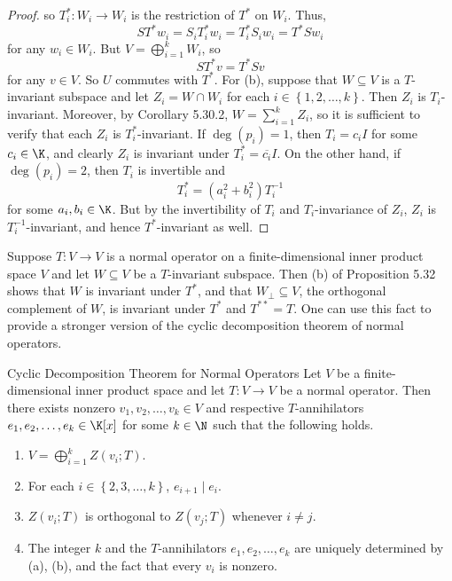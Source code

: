 \documentclass[linearalgebraII]{subfiles}
\begin{document}
\begin{proof}
        so $T_i^{*} : W_i\to W_i$ is the restriction of $T^{*}$ on $W_i$. Thus,
        \begin{equation*}
            ST^{*} w_i = S_iT_i^{*} w_i = T_i^{*}S_iw_i = T^{*} Sw_i
        \end{equation*}
        for any $w_i\in W_i$. But $V=\bigoplus^{k}_{i=1} W_i$, so
        \begin{equation*}
            ST^{*} v = T^{*} Sv
        \end{equation*}
        for any $v\in V$. So $U$ commutes with $T^{*}$. For (b), suppose that $W\subseteq V$ is a $T$-invariant subspace and let $Z_i = W\cap W_i$ for each $i\in\left\lbrace 1,2,\ldots,k \right\rbrace$. Then $Z_i$ is $T_i$-invariant. Moreover, by Corollary 5.30.2, $W = \sum^{k}_{i=1} Z_i$, so it is sufficient to verify that each $Z_i$ is $T_i^{*}$-invariant. If $\deg\left( p_i \right) = 1$, then $T_i = c_iI$ for some $c_i\in\K$, and clearly $Z_i$ is invariant under $T_i^{*} = \overline{c_i}I$. On the other hand, if $\deg\left( p_i \right) = 2$, then $T_i$ is invertible and
        \begin{equation*}
            T_i^{*}  = \left( a_i^{2} +b_i^{2}  \right) T_i^{-1} 
        \end{equation*}
        for some $a_i,b_i\in\K$. But by the invertibility of $T_i$ and $T_i$-invariance of $Z_i$, $Z_i$ is $T_i^{-1}$-invariant, and hence $T^{*}$-invariant as well.
    \end{proof}

    \begin{remark}
        Suppose $T:V\to V$ is a normal operator on a finite-dimensional inner product space $V$ and let $W\subseteq V$ be a $T$-invariant subspace. Then (b) of Proposition 5.32 shows that $W$ is invariant under $T^{*}$, and that $W_\perp\subseteq V$, the orthogonal complement of $W$, is invariant under $T^{*}$ and $T^{**} = T$. One can use this fact to provide a stronger version of the cyclic decomposition theorem of normal operators.
    \end{remark}

    \begin{theorem}{Cyclic Decomposition Theorem for Normal Operators}
        Let $V$ be a finite-dimensional inner product space and let $T:V\to V$ be a normal operator. Then there exists nonzero $v_1,v_2,\ldots,v_k\in V$ and respective $T$-annihilators $e_1,e_2,\ldots,e_k\in\K[x]$ for some $k\in\N$ such that the following holds.
        \begin{enumerate}
            \item $V=\bigoplus^{k}_{i=1} Z\left( v_i;T \right)$.
            \item For each $i\in\left\lbrace 2,3,\ldots,k \right\rbrace$, $e_{i+1}\mid e_i$.
            \item $Z\left( v_i;T \right)$ is orthogonal to $Z\left( v_j;T \right)$ whenever $i\neq j$.
            \item The integer $k$ and the $T$-annihilators $e_1,e_2,\ldots,e_k$ are uniquely determined by (a), (b), and the fact that every $v_i$ is nonzero.
        \end{enumerate}
    \end{theorem}
\end{document}
